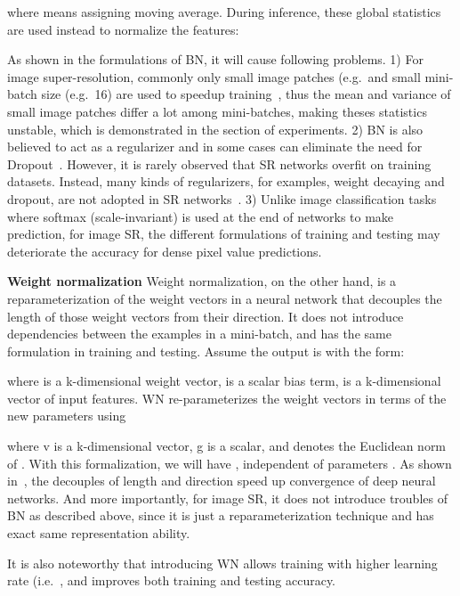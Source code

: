 \documentclass{article}
\begin{document}
where  means assigning moving average. During inference, these global statistics are used instead to normalize the features:


As shown in the formulations of BN, it will cause following problems.
1) For image super-resolution, commonly only small image patches (e.g.\  and small mini-batch size (e.g.\ 16) are used to speedup training~\cite{fan2017balanced, kim2016accurate, ledig2016photo, lim2017enhanced, tai2017memnet, tong2017image, 2018arXiv180208797Z}, thus the mean and variance of small image patches differ a lot among mini-batches, making theses statistics unstable, which is demonstrated in the section of experiments.
2) BN is also believed to act as a regularizer and in some cases can eliminate the need for Dropout~\cite{ioffe2015batch}. However, it is rarely observed that SR networks overfit on training datasets. Instead, many kinds of regularizers, for examples, weight decaying and dropout, are not adopted in SR networks~\cite{fan2017balanced, kim2016accurate, ledig2016photo, lim2017enhanced, tai2017memnet, tong2017image, 2018arXiv180208797Z}.
3) Unlike image classification tasks where softmax (scale-invariant) is used at the end of networks to make prediction, for image SR, the different formulations of training and testing may deteriorate the accuracy for dense pixel value predictions.

\textbf{Weight normalization} Weight normalization, on the other hand, is a reparameterization of the weight vectors in a neural network that decouples the length of those weight vectors from their direction. It does not introduce dependencies between the examples in a mini-batch, and has the same formulation in training and testing. Assume the output  is with the form:

where  is a k-dimensional weight vector,  is a scalar bias term,  is a k-dimensional vector of input features. WN re-parameterizes the weight vectors in terms of the new parameters using

where v is a k-dimensional vector, g is a scalar, and  denotes the Euclidean norm of . With this formalization, we will have , independent of parameters . As shown in~\cite{salimans2016weight}, the decouples of length and direction speed up convergence of deep neural networks. And more importantly, for image SR, it does not introduce troubles of BN as described above, since it is just a reparameterization technique and has exact same representation ability.

It is also noteworthy that introducing WN allows training with higher learning rate (i.e.\ , and improves both training and testing accuracy.
\end{document}
